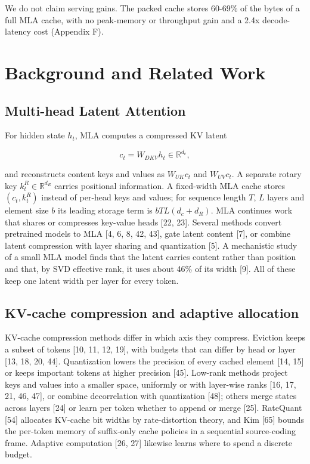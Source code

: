 \documentclass[11pt]{article}
\begin{document}
We do not claim serving gains. The packed cache stores 60-69\% of the bytes of a full MLA cache, with no peak-memory or throughput gain and a 2.4x decode-latency cost (Appendix F).

\section{Background and Related Work}

\subsection{Multi-head Latent Attention}

For hidden state $h_t$, MLA computes a compressed KV latent

\[c_t = W_{DKV}h_t \in \mathbb{R}^{d_c},\]

and reconstructs content keys and values as $W_{UK}c_t$ and $W_{UV}c_t$. A separate rotary key $k_t^R \in \mathbb{R}^{d_R}$ carries positional information. A fixed-width MLA cache stores $(c_t,k_t^R)$ instead of per-head keys and values; for sequence length $T$, $L$ layers and element size $b$ its leading storage term is $bTL(d_c+d_R)$. MLA continues work that shares or compresses key-value heads [22, 23]. Several methods convert pretrained models to MLA [4, 6, 8, 42, 43], gate latent content [7], or combine latent compression with layer sharing and quantization [5]. A mechanistic study of a small MLA model finds that the latent carries content rather than position and that, by SVD effective rank, it uses about 46\% of its width [9]. All of these keep one latent width per layer for every token.

\subsection{KV-cache compression and adaptive allocation}

KV-cache compression methods differ in which axis they compress. Eviction keeps a subset of tokens [10, 11, 12, 19], with budgets that can differ by head or layer [13, 18, 20, 44]. Quantization lowers the precision of every cached element [14, 15] or keeps important tokens at higher precision [45]. Low-rank methods project keys and values into a smaller space, uniformly or with layer-wise ranks [16, 17, 21, 46, 47], or combine decorrelation with quantization [48]; others merge states across layers [24] or learn per token whether to append or merge [25]. RateQuant [54] allocates KV-cache bit widths by rate-distortion theory, and Kim [65] bounds the per-token memory of suffix-only cache policies in a sequential source-coding frame. Adaptive computation [26, 27] likewise learns where to spend a discrete budget.
\end{document}
